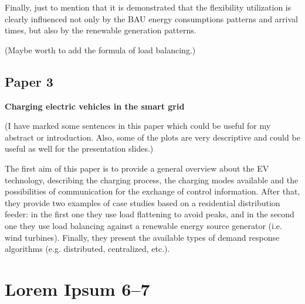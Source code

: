 Finally, just to mention that it is demonstrated that the flexibility utilization is clearly influenced not only by the BAU energy consumptions patterns and arrival times, but also by the renewable generation patterns.

(Maybe worth to add the formula of load balancing.)

\subsection{Paper 3}
\textbf{Charging electric vehicles in the smart grid}

(I have marked some sentences in this paper which could be useful for my abstract or introduction. Also, some of the plots are very descriptive and could be useful as well for the presentation slides.)

The first aim of this paper is to provide a general overview about the EV technology, describing the charging process, the charging modes available and the possibilities of communication for the exchange of control information. After that, they provide two examples of case studies based on a residential distribution feeder: in the first one they use load flattening to avoid peaks, and in the second one they use load balancing against a renewable energy source generator (i.e. wind turbines). Finally, they present the available types of demand response algorithms (e.g. distributed, centralized, etc.).

\section{Lorem Ipsum 6--7}
\lipsum[6-7]

